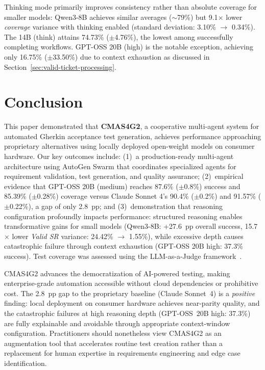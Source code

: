 \documentclass[runningheads]{llncs}
\begin{document}
Thinking mode primarily improves consistency rather than absolute coverage for smaller models: Qwen3-8B achieves similar averages ($\sim$79\%) but 9.1$\times$ lower \textit{coverage} variance with thinking enabled (standard deviation: 3.10\% $\to$ 0.34\%).
The 14B (think) attains 74.73\% ($\pm$4.76\%), the lowest among successfully completing workflows. GPT-OSS 20B (high) is the notable exception, achieving only 16.75\% ($\pm$33.50\%) due to context exhaustion as discussed in Section~\ref{sec:valid-ticket-processing}.

\section{Conclusion}
\label{sec:conclusion}
This paper demonstrated that \textbf{CMAS4G2}, a cooperative multi-agent system for automated Gherkin acceptance test generation, achieves performance approaching proprietary alternatives using locally deployed open-weight models on consumer hardware. Our key outcomes include: (1)~a production-ready multi-agent architecture using AutoGen Swarm that coordinates specialized agents for requirement validation, test generation, and quality assurance; (2)~empirical evidence that GPT-OSS 20B (medium) reaches 87.6\% ($\pm$0.8\%) success and 85.39\% ($\pm$0.28\%) coverage versus Claude Sonnet 4's 90.4\% ($\pm$0.2\%) and 91.57\% ($\pm$0.22\%), a gap of only 2.8~pp; and (3)~demonstration that reasoning configuration profoundly impacts performance: structured reasoning enables transformative gains for small models (Qwen3-8B: +27.6~pp overall success, 15.7$\times$ lower \textit{Valid SR} variance: 24.42\% $\to$ 1.55\%), while excessive depth causes catastrophic failure through context exhaustion (GPT-OSS 20B high: 37.3\% success). Test coverage was assessed using the LLM-as-a-Judge framework~\cite{huang2025laj}.

CMAS4G2 advances the democratization of AI-powered testing, making enterprise-grade automation accessible without cloud dependencies or prohibitive cost. The 2.8~pp gap to the proprietary baseline (Claude Sonnet~4) is a \emph{positive} finding: local deployment on consumer hardware achieves near-parity quality, and the catastrophic failures at high reasoning depth (GPT-OSS~20B high: 37.3\%) are fully explainable and avoidable through appropriate context-window configuration. Practitioners should nonetheless view CMAS4G2 as an augmentation tool that accelerates routine test creation rather than a replacement for human expertise in requirements engineering and edge case identification.
\end{document}

